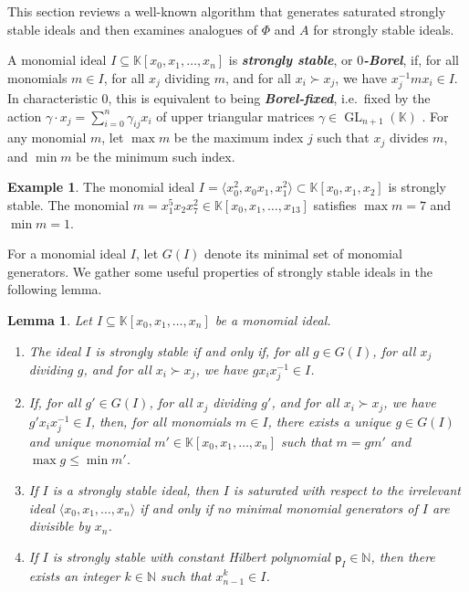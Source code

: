 \documentclass[12pt]{amsart}%
\newtheorem{lemma}[theorem]{Lemma}
\theoremstyle{definition}%
\newtheorem{example}[theorem]{Example}
\newcommand{\hp}{\mathsf{p}}%
\newcommand{\lift}{\Phi}%
\newcommand{\plus}{A}%
\newcommand{\kk}{\mathbb{K}}%
\newcommand{\NN}{\mathbb{N}}%
\DeclareMathOperator{\lexg}{\succ}%
\begin{document}
This section reviews a well-known algorithm that generates saturated
strongly stable ideals and then examines analogues of $\lift$ and
$\plus$ for strongly stable ideals.

A monomial ideal $I \subseteq \kk[x_0, x_1, \dotsc , x_n]$ is
\emph{\bfseries strongly stable}, or \emph{\bfseries $0$-Borel}, if,
for all monomials $m \in I$, for all $x_j$ dividing $m$, and for all
$x_i \lexg x_j$, we have $x_j^{-1} m x_i \in I$.  In characteristic
$0$, this is equivalent to being \emph{\bfseries Borel-fixed},
i.e.\ fixed by the action $\gamma \cdot x_j = \sum_{i=0}^{n}
\gamma_{ij} x_i$ of upper triangular matrices $\gamma \in
\operatorname{GL}_{n+1}(\kk)$
\cite[Proposition~2.7]{Bayer--Stillman--1987}.  For any monomial $m$,
let $\max m$ be the maximum index $j$ such that $x_j$ divides $m$, and
$\min m$ be the minimum such index.

\begin{example}
  The monomial ideal $I = \langle x_0^2, x_0 x_1, x_1^2 \rangle
  \subset \kk[x_0, x_1, x_2]$ is strongly stable.  The monomial $m =
  x_1^5 x_2 x_7^2 \in \kk[x_0, x_1, \dotsc, x_{13}]$ satisfies $\max m
  = 7$ and $\min m = 1$.
\end{example}

For a monomial ideal $I$, let $G(I)$ denote its minimal set of
monomial generators.  We gather some useful properties of strongly
stable ideals in the following lemma.

\begin{lemma}
  \label{lem:SSproperties}
  Let $I \subseteq \kk[x_0, x_1, \dotsc, x_n]$ be a monomial ideal.
  \begin{enumerate}
  \item The ideal $I$ is strongly stable if and only if, for all $g
    \in G(I)$, for all $x_j$ dividing $g$, and for all $x_i \lexg
    x_j$, we have $g x_i x_j^{-1} \in I$.
    
  \item If, for all $g' \in G(I)$, for all $x_j$ dividing $g'$, and
    for all $x_i \lexg x_j$, we have $g' x_i x_j^{-1} \in I$, then,
    for all monomials $m \in I$, there exists a unique $g \in G(I)$
    and unique monomial $m' \in \kk[x_0, x_1, \dotsc, x_n]$ such that
    $m = g m'$ and $\max g \le \min m'$.
    
  \item If $I$ is a strongly stable ideal, then $I$ is saturated with
    respect to the irrelevant ideal $\langle x_0, x_1, \dotsc, x_n
    \rangle$ if and only if no minimal monomial generators of $I$ are
    divisible by $x_n$.
    
  \item If $I$ is strongly stable with constant Hilbert polynomial
    $\hp_I \in \NN$, then there exists an integer $k \in \NN$ such
    that $x_{n-1}^k \in I$.
  \end{enumerate}
\end{lemma}
\end{document}
